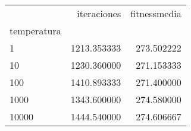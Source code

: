 \begin{tabular}{lrr}
\toprule
{} &  iteraciones &  fitnessmedia \\
temperatura &              &               \\
\midrule
1           &  1213.353333 &    273.502222 \\
10          &  1230.360000 &    271.153333 \\
100         &  1410.893333 &    271.400000 \\
1000        &  1343.600000 &    274.580000 \\
10000       &  1444.540000 &    274.606667 \\
\bottomrule
\end{tabular}
